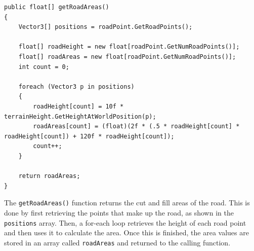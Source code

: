 \documentclass[onecolumn, draftclsnofoot,10pt, compsoc]{IEEEtran}
\begin{document}
\newpage

\begin{lstlisting}[caption=A code snippet from the cut and fill manager demonstrating how cut and fill calculations work., label=lst:cutfill,captionpos=b]
public float[] getRoadAreas()
{
    Vector3[] positions = roadPoint.GetRoadPoints();

    float[] roadHeight = new float[roadPoint.GetNumRoadPoints()];
    float[] roadAreas = new float[roadPoint.GetNumRoadPoints()];
    int count = 0;

    foreach (Vector3 p in positions)
    {
        roadHeight[count] = 10f * terrainHeight.GetHeightAtWorldPosition(p);
        roadAreas[count] = (float)(2f * (.5 * roadHeight[count] * roadHeight[count]) + 120f * roadHeight[count]);
        count++;
    }

    return roadAreas;
}
\end{lstlisting}

The \texttt{getRoadAreas()} function returns the cut and fill areas of the road. This is done by first retrieving the points that make up the road, as shown in the \texttt{positions} array. Then, a for-each loop retrieves the height of each road point and then uses it to calculate the area. Once this is finished, the area values are stored in an array called \texttt{roadAreas} and returned to the calling function.

\end{document}
